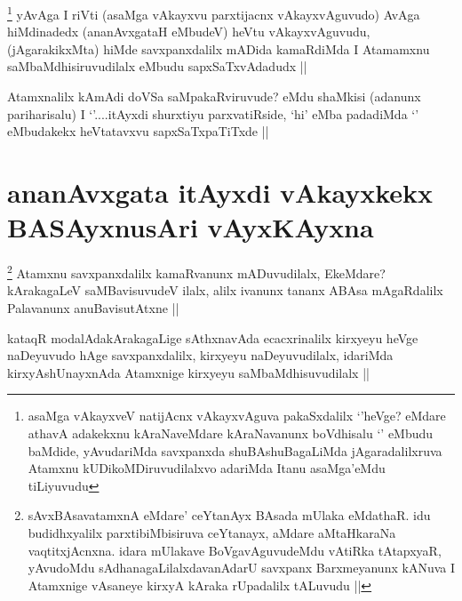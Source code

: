
\begin{artha}
\footnote{asaMga vAkayxveV natijAcnx vAkayxvAguva pakaSxdalilx `\stext'heVge? eMdare athavA adakekxnu kAraNaveMdare kAraNavanunx boVdhisalu `\stext' eMbudu baMdide, yAvudariMda savxpanxda shuBAshuBagaLiMda jAgaradalilxruva Atamxnu kUDikoMDiruvudilalxvo adariMda Itanu asaMga'eMdu tiLiyuvudu}
yAvAga I riVti (asaMga vAkayxvu parxtijacnx vAkayxvAguvudo) AvAga hiMdinadedx (ananAvxgataH eMbudeV) heVtu vAkayxvAguvudu, (jAgarakikxMta) hiMde savxpanxdalilx mADida kamaRdiMda I Atamamxnu saMbaMdhisiruvudilalx eMbudu sapxSaTxvAdadudx ||
\end{artha}


\begin{artha}
Atamxnalilx kAmAdi doVSa saMpakaRviruvude? eMdu shaMkisi (adanunx pariharisalu) I `\stext'....itAyxdi shurxtiyu parxvatiRside, `hi' eMba padadiMda `\stext' eMbudakekx heVtatavxvu sapxSaTxpaTiTxde ||
\end{artha}

\section*{ananAvxgata itAyxdi vAkayxkekx BASAyxnusAri vAyxKAyxna}


\begin{artha}
\footnote{sAvxBAsavatamxnA eMdare' ceYtanAyx BAsada mUlaka eMdathaR. idu budidhxyalilx parxtibiMbisiruva ceYtanayx, aMdare aMtaHkaraNa vaqtitxjAcnxna. idara mUlakave BoVgavAguvudeMdu vAtiRka tAtapxyaR, yAvudoMdu sAdhanagaLilalxdavanAdarU savxpanx Barxmeyanunx kANuva I Atamxnige vAsaneye kirxyA kAraka rUpadalilx tALuvudu ||}
Atamxnu savxpanxdalilx kamaRvanunx mADuvudilalx, EkeMdare? kArakagaLeV saMBavisuvudeV ilalx, alilx ivanunx tananx ABAsa mAgaRdalilx Palavanunx anuBavisutAtxne ||
\end{artha}


\begin{artha}
kataqR modalAdakArakagaLige sAthxnavAda ecacxrinalilx kirxyeyu heVge naDeyuvudo hAge savxpanxdalilx, kirxyeyu naDeyuvudilalx, idariMda kirxyAshUnayxnAda Atamxnige kirxyeyu saMbaMdhisuvudilalx ||
\end{artha}

